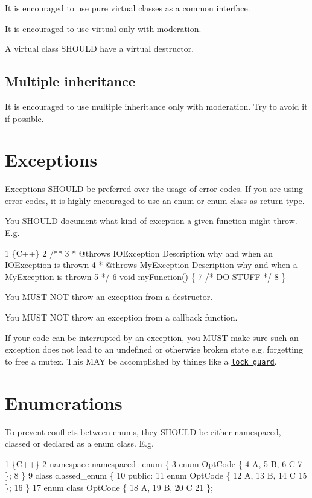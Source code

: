 It is encouraged to use pure virtual classes as a common interface.

It is encouraged to use {\ttfamily virtual} only with moderation.

A {\ttfamily virtual} class S\+H\+O\+U\+LD have a {\ttfamily virtual} destructor.

\subsection*{Multiple inheritance}

It is encouraged to use multiple inheritance only with moderation. Try to avoid it if possible.

\section*{Exceptions}

Exceptions S\+H\+O\+U\+LD be preferred over the usage of error codes. If you are using error codes, it is highly encouraged to use an {\ttfamily enum} or {\ttfamily enum class} as return type.

You S\+H\+O\+U\+LD document what kind of exception a given function might throw. E.\+g. 
\begin{DoxyCode}
1 \{C++\}
2 /**
3  * @throws IOException Description why and when an IOException is thrown
4  * @throws MyException Description why and when a MyException is thrown
5  */
6 void myFunction() \{
7     /* DO STUFF */
8 \}
\end{DoxyCode}


You M\+U\+ST N\+OT throw an exception from a destructor.

You M\+U\+ST N\+OT throw an exception from a callback function.

If your code can be interrupted by an exception, you M\+U\+ST make sure such an exception does not lead to an undefined or otherwise broken state e.\+g. forgetting to free a {\ttfamily mutex}. This M\+AY be accomplished by things like a \href{https://en.cppreference.com/w/cpp/thread/lock_guard}{\tt lock\+\_\+guard}.

\section*{Enumerations}

To prevent conflicts between enums, they S\+H\+O\+U\+LD be either namespaced, classed or declared as a {\ttfamily enum class}. E.\+g. 
\begin{DoxyCode}
1 \{C++\}
2 namespace namespaced\_enum \{
3     enum OptCode \{
4         A,
5         B,
6         C
7     \};
8 \}
9 class classed\_enum \{
10     public:
11     enum OptCode \{
12         A,
13         B,
14         C
15     \};
16 \}
17 enum class OptCode \{
18     A,
19     B,
20     C
21 \};
\end{DoxyCode}


